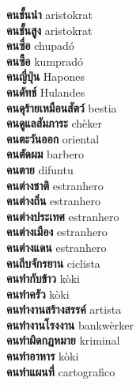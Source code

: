 \textbf{ คนชั้นนำ  } aristokrat \\
\textbf{ คนชั้นสูง  } aristokrat \\
\textbf{ คนซื่อ  } chupadó \\
\textbf{ คนซื้อ  } kumpradó \\
\textbf{ คนญี่ปุ่น  } Hapones \\
\textbf{ คนดัทช์  } Hulandes \\
\textbf{ คนดุร้ายเหมือนสัตว์  } bestia \\
\textbf{ คนดูแลสัมภาระ  } chèker \\
\textbf{ คนตะวันออก  } oriental \\
\textbf{ คนตัดผม  } barbero \\
\textbf{ คนตาย  } difuntu \\
\textbf{ คนต่างชาติ  } estranhero \\
\textbf{ คนต่างถิ่น  } estranhero \\
\textbf{ คนต่างประเทศ  } estranhero \\
\textbf{ คนต่างเมือง  } estranhero \\
\textbf{ คนต่างแดน  } estranhero \\
\textbf{ คนถีบจักรยาน  } ciclista \\
\textbf{ คนทำกับข้าว  } kòki \\
\textbf{ คนทำครัว  } kòki \\
\textbf{ คนทำงานสร้างสรรค์  } artista \\
\textbf{ คนทำงานโรงงาน  } bankwèrker \\
\textbf{ คนทำผิดกฎหมาย  } kriminal \\
\textbf{ คนทำอาหาร  } kòki \\
\textbf{ คนทำแผนที่  } cartografico \\
